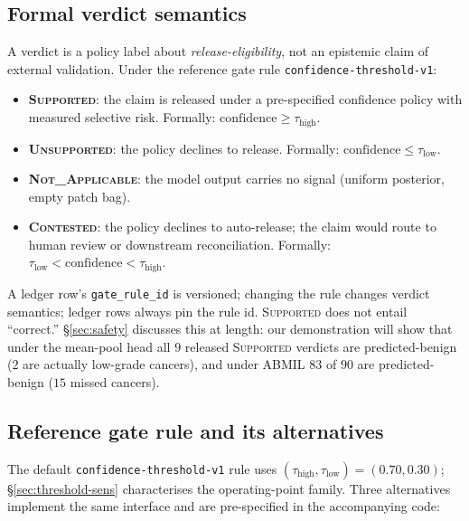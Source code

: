 \documentclass{article}
\newcommand{\SafeNum}[1]{#1}
\newcommand{\AggNum}[2]{#2}
\begin{document}
\subsection{Formal verdict semantics}
\label{sec:verdict-semantics}

A verdict is a policy label about \emph{release-eligibility}, not an epistemic claim of external validation. Under the reference gate rule \texttt{confidence-threshold-v1}:

\begin{itemize}
    \item \textbf{\textsc{Supported}}: the claim is released under a pre-specified confidence policy with measured selective risk. Formally: $\text{confidence} \ge \tau_{\text{high}}$.
    \item \textbf{\textsc{Unsupported}}: the policy declines to release. Formally: $\text{confidence} \le \tau_{\text{low}}$.
    \item \textbf{\textsc{Not\_Applicable}}: the model output carries no signal (uniform posterior, empty patch bag).
    \item \textbf{\textsc{Contested}}: the policy declines to auto-release; the claim would route to human review or downstream reconciliation. Formally: $\tau_{\text{low}} < \text{confidence} < \tau_{\text{high}}$.
\end{itemize}

A ledger row's \texttt{gate\_rule\_id} is versioned; changing the rule changes verdict semantics; ledger rows always pin the rule id. \textsc{Supported} does not entail ``correct.'' \S\ref{sec:safety} discusses this at length: our demonstration will show that under the mean-pool head all $\SafeNum{9}$ released \textsc{Supported} verdicts are predicted-benign ($\SafeNum{2}$ are actually low-grade cancers), and under ABMIL $\AggNum{abmil.supported.grade0.n}{83}$ of $\AggNum{abmil.supported.n}{90}$ are predicted-benign ($\AggNum{abmil.supported.missed_cancer}{15}$ missed cancers).

\subsection{Reference gate rule and its alternatives}
\label{sec:alt-rules}

The default \texttt{confidence-threshold-v1} rule uses $(\tau_{\text{high}}, \tau_{\text{low}}) = (0.70, 0.30)$; \S\ref{sec:threshold-sens} characterises the operating-point family. Three alternatives implement the same interface and are pre-specified in the accompanying code:
\end{document}
